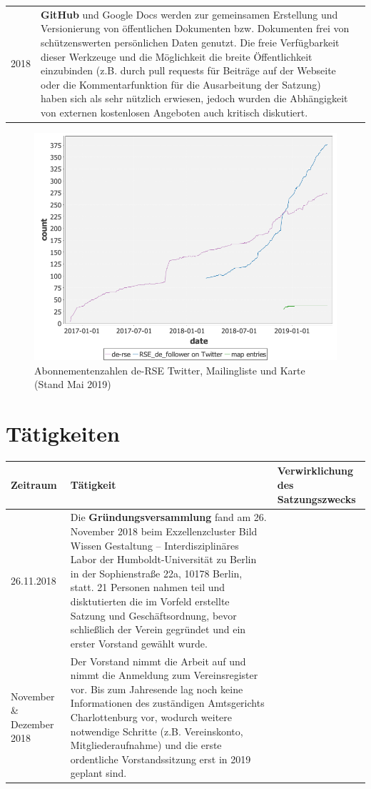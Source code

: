 \documentclass[a4paper]{article}
\begin{document}
\begin{center}
\begin{longtable}{| p{} | p{} | p{} |}
& \\
\hline
2018 & \textbf{GitHub} und Google Docs werden zur gemeinsamen Erstellung und Versionierung von öffentlichen Dokumenten bzw. Dokumenten frei von schützenswerten persönlichen Daten genutzt. Die freie Verfügbarkeit dieser Werkzeuge und die Möglichkeit die breite Öffentlichkeit einzubinden (z.B. durch pull requests für Beiträge auf der Webseite oder die Kommentarfunktion für die Ausarbeitung der Satzung) haben sich als sehr nützlich erwiesen, jedoch wurden die Abhängigkeit von externen kostenlosen Angeboten auch kritisch diskutiert. & \\
\hline
\end{longtable}
\end{center}

\begin{figure}[htb]
  \centering
  \includegraphics[width=.5\textwidth]{2019_05_mailinglist_counter}
  \caption{Abonnementenzahlen de-RSE Twitter, Mailingliste und Karte (Stand Mai 2019) \label{fig:abo201905}}
\end{figure}

\section{Tätigkeiten}

\begin{longtable}{| p{} | p{} | p{} |}
\hline
\textbf{Zeitraum} & \textbf{Tätigkeit} & \textbf{Verwirklichung des Satzungszwecks} \\
\hline
26.11.2018   & Die \textbf{Gründungsversammlung} fand am 26. November 2018 beim Exzellenzcluster Bild Wissen Gestaltung -- Interdisziplinäres Labor der Humboldt-Universität zu Berlin in der Sophienstraße 22a, 10178 Berlin, statt. 21 Personen nahmen teil und disktutierten die im Vorfeld erstellte Satzung und Geschäftsordnung, bevor schließlich der Verein gegründet und ein erster Vorstand gewählt wurde.  & \\
\hline
November \& Dezember 2018 & Der Vorstand nimmt die Arbeit auf und nimmt die Anmeldung zum Vereinsregister vor. Bis zum Jahresende lag noch keine Informationen des zuständigen Amtsgerichts Charlottenburg vor, wodurch weitere notwendige Schritte (z.B. Vereinskonto, Mitgliederaufnahme) und die erste ordentliche Vorstandssitzung erst in 2019 geplant sind. & \\
\hline
\end{longtable}
\end{document}

